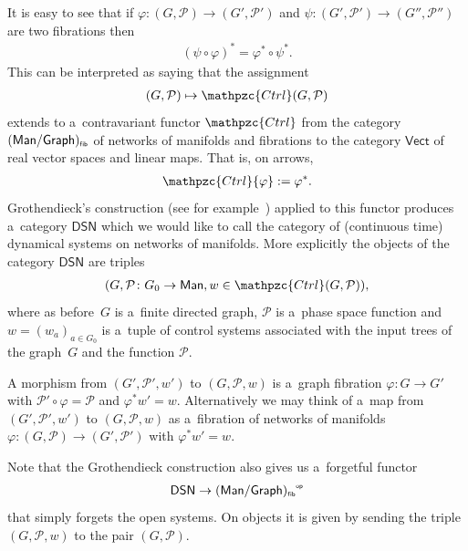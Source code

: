 \documentclass[pdftex]{sigma}
\numberwithin{equation}{section}
\newcommand{\op}[1]{{#1}^{\mbox{\sf{\tiny{op}}}}}
\begin{document}
\begin{Remark}
It is easy to see that if $\varphi:(G,{\mathcal P}) \to (G',{\mathcal P}')$ and $\psi:(G',{\mathcal P}')\to (G'',
{\mathcal P}'')$ are two f\/ibrations then
\begin{gather*}
(\psi\circ \varphi)^* = \varphi^*\circ \psi^*.
\end{gather*}
This can be interpreted as saying that the assignment
\begin{gather*}
(G,{\mathcal P})\mapsto \mathpzc{Ctrl}(G,{\mathcal P})
\end{gather*}
extends to a~contravariant functor $\mathpzc{Ctrl}$ from the category
$(\mathsf{Man}/\mathsf{Graph})_{\mbox{\sf{\tiny{f\/ib}}}} $ of networks of manifolds and f\/ibrations to the category
$\mathsf{Vect}$ of real vector spaces and linear maps.
That is, on arrows,
\begin{gather*}
\mathpzc{Ctrl}{\varphi}: = \varphi^*.
\end{gather*}
Grothendieck's construction (see for example~\cite{Awodey}) applied to this functor produces a~category $\mathsf{DSN}$
which we would like to call the category of (continuous time) dynamical systems on networks of manifolds.
More explicitly the objects of the category $\mathsf{DSN}$ are triples
\begin{gather*}
(G, {\mathcal P}\colon G_0 \to \mathsf{Man}, w\in \mathpzc{Ctrl}(G,{\mathcal P})),
\end{gather*}
where as before~$G$ is a~f\/inite directed graph, ${\mathcal P}$ is a~phase space function and $w=(w_a)_{a\in G_0}$ is
a~tuple of control systems associated with the input trees of the graph~$G$ and the function ${\mathcal P}$.

A morphism from $(G',{\mathcal P}', w')$ to $(G, {\mathcal P},w)$ is a~graph f\/ibration $\varphi\colon G\to G'$ with
${\mathcal P}' \circ \varphi = {\mathcal P}$ and $\varphi^*w' = w$.
Alternatively we may think of a~map from $(G',{\mathcal P}', w')$ to $(G, {\mathcal P},w)$ as a~f\/ibration of networks of
manifolds $\varphi\colon (G,{\mathcal P}) \to (G',{\mathcal P}')$ with $\varphi^*w' = w$.

Note that the Grothendieck construction also gives us a~forgetful functor
\begin{gather*}
\mathsf{DSN} \to \op{(\mathsf{Man}/\mathsf{Graph})_{\mbox{\sf{\tiny{f\/ib}}}}}
\end{gather*}
that simply forgets the open systems.
On objects it is given by sending the triple $(G,{\mathcal P}, w)$ to the pair $(G,{\mathcal P})$.
\end{Remark}
\end{document}

